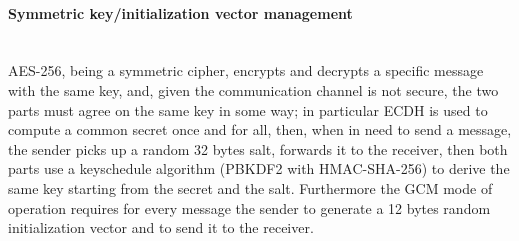 \paragraph{Symmetric key/initialization vector management} \hspace{0pt} \\
\small{AES-256, being a symmetric cipher, encrypts and decrypts a specific message with the same key, and, given the communication channel is not secure, the two parts must agree on the same key in some way; in particular ECDH is used to compute a common secret once and for all, then, when in need to send a message, the sender picks up a random 32 bytes salt, forwards it to the receiver, then both parts use a keyschedule algorithm (PBKDF2 with HMAC-SHA-256) to derive the same key starting from the secret and the salt. Furthermore the GCM mode of operation requires for every message the sender to generate a 12 bytes random initialization vector and to send it to the receiver.}